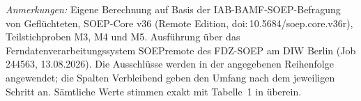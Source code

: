 \begin{table}[htbp]
  \vspace{0.75ex}
  \parbox{\textwidth}{\footnotesize
    \textit{Anmerkungen:} Eigene Berechnung auf Basis der IAB-BAMF-SOEP-Befragung
    von Gefl\"uchteten, SOEP-Core v36 (Remote Edition,
    doi:\,10.5684/soep.core.v36r), Teilstichproben M3, M4 und M5. Ausf\"uhrung
    \"uber das Ferndatenverarbeitungssystem SOEPremote des FDZ-SOEP am DIW Berlin
    (Job 244563, 13.08.2026). Die Ausschl\"usse werden in der angegebenen
    Reihenfolge angewendet; die Spalten \glqq Verbleibend\grqq{} geben den Umfang
    nach dem jeweiligen Schritt an. S\"amtliche Werte stimmen exakt mit
    Tabelle~1 in \textcite{Kanas:2023} \"uberein.%
    }
\end{table}



